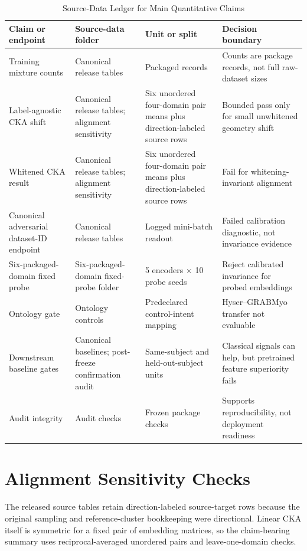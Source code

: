 \documentclass[journal]{IEEEtran}
\begin{document}
\begin{table}[!t]
\caption{Source-Data Ledger for Main Quantitative Claims}
\label{tab:s_reproledger}
\centering
\scriptsize
\begin{tabularx}{\textwidth}{@{}p{3.0cm}p{2.9cm}p{3.0cm}Y@{}}
\toprule
Claim or endpoint & Source-data folder & Unit or split & Decision boundary \\
\midrule
Training mixture counts & Canonical release tables & Packaged records & Counts are package records, not full raw-dataset sizes \\
Label-agnostic CKA shift & Canonical release tables; alignment sensitivity & Six unordered four-domain pair means plus direction-labeled source rows & Bounded pass only for small unwhitened geometry shift \\
Whitened CKA result & Canonical release tables; alignment sensitivity & Six unordered four-domain pair means plus direction-labeled source rows & Fail for whitening-invariant alignment \\
Canonical adversarial dataset-ID endpoint & Canonical release tables & Logged mini-batch readout & Failed calibration diagnostic, not invariance evidence \\
Six-packaged-domain fixed probe & Six-packaged-domain fixed-probe folder & 5 encoders $\times$ 10 probe seeds & Reject calibrated invariance for probed embeddings \\
Ontology gate & Ontology controls & Predeclared control-intent mapping & Hyser--GRABMyo transfer not evaluable \\
Downstream baseline gates & Canonical baselines; post-freeze confirmation audit & Same-subject and held-out-subject units & Classical signals can help, but pretrained feature superiority fails \\
Audit integrity & Audit checks & Frozen package checks & Supports reproducibility, not deployment readiness \\
\bottomrule
\end{tabularx}
\end{table}

\section{Alignment Sensitivity Checks}

The released source tables retain direction-labeled source-target rows because the original sampling and reference-cluster bookkeeping were directional. Linear CKA itself is symmetric for a fixed pair of embedding matrices, so the claim-bearing summary uses reciprocal-averaged unordered pairs and leave-one-domain checks.
\end{document}
